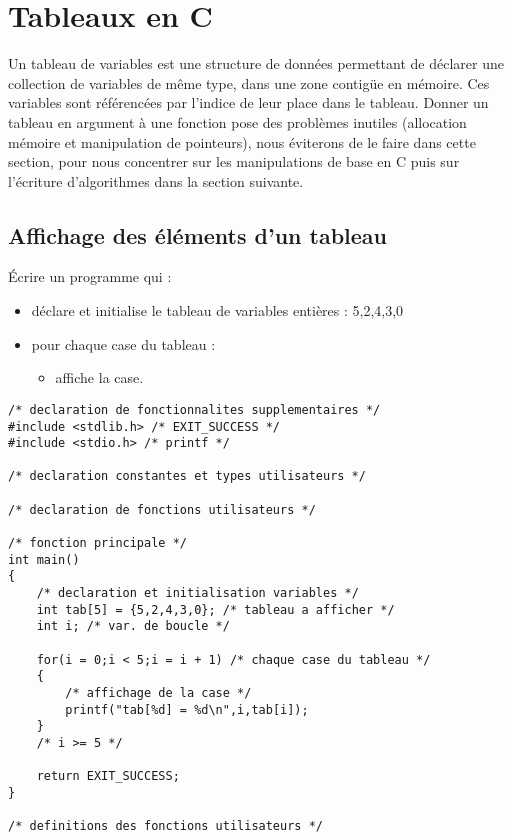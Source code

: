 
\newcommand{\commentaire}[1]{}


\section{Tableaux en C}
\label{intro}

Un tableau de variables est une structure de données permettant de
déclarer une collection de variables de même type, dans une zone
contigüe en mémoire. Ces variables sont référencées par l'indice de
leur place dans le tableau. Donner un tableau en argument à une
fonction pose des problèmes inutiles (allocation mémoire
 et manipulation de pointeurs), nous éviterons de le faire dans cette
 section, pour nous concentrer sur les manipulations de base en C puis sur
 l'écriture d'algorithmes dans la section suivante.

\subsection{Affichage des éléments d'un tableau}

Écrire un programme qui :
\begin{itemize}
\item déclare et initialise le tableau de variables entières : 5,2,4,3,0
\item pour chaque case du tableau :
  \begin{itemize}
  \item affiche la case.
  \end{itemize}
\end{itemize}

\begin{correction}
\begin{verbatim}
/* declaration de fonctionnalites supplementaires */
#include <stdlib.h> /* EXIT_SUCCESS */
#include <stdio.h> /* printf */

/* declaration constantes et types utilisateurs */

/* declaration de fonctions utilisateurs */

/* fonction principale */
int main()
{
    /* declaration et initialisation variables */
    int tab[5] = {5,2,4,3,0}; /* tableau a afficher */
    int i; /* var. de boucle */

    for(i = 0;i < 5;i = i + 1) /* chaque case du tableau */
    {
        /* affichage de la case */
        printf("tab[%d] = %d\n",i,tab[i]);
    }
    /* i >= 5 */

    return EXIT_SUCCESS;
}

/* definitions des fonctions utilisateurs */

\end{verbatim}
\end{correction}

